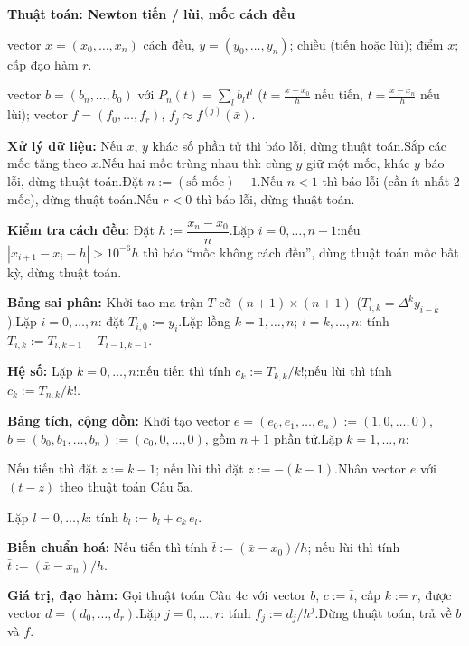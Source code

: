 \documentclass[11pt,a4paper]{article}
\newenvironment{thuattoan}[1]
  {\par\medskip\noindent\textbf{Thuật toán: #1}\begin{description}[style=standard,align=left,leftmargin=4.3em,labelwidth=3.9em,labelsep=0.4em,itemsep=1pt,topsep=3pt,font=\normalfont\bfseries]}
  {\end{description}}
\newenvironment{con}
  {\begin{description}[style=standard,align=left,leftmargin=2.1em,labelwidth=1.8em,labelsep=0.3em,itemsep=0pt,topsep=1pt,font=\normalfont]}
  {\end{description}}
\newcommand{\thut}{\newline\hspace*{1.2em}}
\begin{document}
\begin{thuattoan}{Newton tiến / lùi, mốc cách đều}
\item[Input:] vector $x=(x_0,\dots,x_n)$ cách đều, $y=(y_0,\dots,y_n)$; chiều (tiến hoặc lùi); điểm $\bar x$; cấp đạo hàm $r$.
\item[Output:] vector $b=(b_n,\dots,b_0)$ với $P_n(t)=\sum_lb_lt^l$ ($t=\frac{x-x_0}{h}$ nếu tiến, $t=\frac{x-x_n}{h}$ nếu lùi); vector $f=(f_0,\dots,f_r)$, $f_j\approx f^{(j)}(\bar x)$.
\item[Bước 0:] \textbf{Xử lý dữ liệu:} Nếu $x$, $y$ khác số phần tử thì báo lỗi, dừng thuật toán.\newline Sắp các mốc tăng theo $x$.\newline Nếu hai mốc trùng nhau thì: cùng $y$ giữ một mốc, khác $y$ báo lỗi, dừng thuật toán.\newline Đặt $n:=(\text{số mốc})-1$.\newline Nếu $n<1$ thì báo lỗi (cần ít nhất 2 mốc), dừng thuật toán.\newline Nếu $r<0$ thì báo lỗi, dừng thuật toán.
\item[Bước 1:] \textbf{Kiểm tra cách đều:} Đặt $h:=\dfrac{x_n-x_0}{n}$.\newline Lặp $i=0,\dots,n-1$:\thut nếu $|x_{i+1}-x_i-h|>10^{-6}h$ thì báo ``mốc không cách đều'', dùng thuật toán mốc bất kỳ, dừng thuật toán.
\item[Bước 2:] \textbf{Bảng sai phân:} Khởi tạo ma trận $T$ cỡ $(n+1)\times(n+1)$ ($T_{i,k}=\Delta^ky_{i-k}$).\newline Lặp $i=0,\dots,n$: đặt $T_{i,0}:=y_i$.\newline Lặp lồng $k=1,\dots,n$; $i=k,\dots,n$: tính $T_{i,k}:=T_{i,k-1}-T_{i-1,k-1}$.
\item[Bước 3:] \textbf{Hệ số:} Lặp $k=0,\dots,n$:\thut nếu tiến thì tính $c_k:=T_{k,k}/k!$;\thut nếu lùi thì tính $c_k:=T_{n,k}/k!$.
\item[Bước 4:] \textbf{Bảng tích, cộng dồn:} Khởi tạo vector $e=(e_0,e_1,\dots,e_n):=(1,0,\dots,0)$, $b=(b_0,b_1,\dots,b_n):=(c_0,0,\dots,0)$, gồm $n+1$ phần tử.\newline Lặp $k=1,\dots,n$:
  \begin{con}
  \item[4.1:] Nếu tiến thì đặt $z:=k-1$; nếu lùi thì đặt $z:=-(k-1)$.\newline Nhân vector $e$ với $(t-z)$ theo thuật toán Câu 5a.
  \item[4.2:] Lặp $l=0,\dots,k$: tính $b_l:=b_l+c_k\,e_l$.
  \end{con}
\item[Bước 5:] \textbf{Biến chuẩn hoá:} Nếu tiến thì tính $\bar t:=(\bar x-x_0)/h$; nếu lùi thì tính $\bar t:=(\bar x-x_n)/h$.
\item[Bước 6:] \textbf{Giá trị, đạo hàm:} Gọi thuật toán Câu 4c với vector $b$, $c:=\bar t$, cấp $k:=r$, được vector $d=(d_0,\dots,d_r)$.\newline Lặp $j=0,\dots,r$: tính $f_j:=d_j/h^j$.\newline Dừng thuật toán, trả về $b$ và $f$.
\end{thuattoan}
\end{document}
